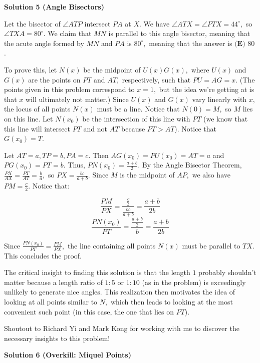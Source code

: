 \begin{enumerate}
 



\textbf{Solution 5 (Angle Bisectors)}

Let the bisector of $\angle ATP$ intersect $PA$ at $X.$ We have $\angle ATX = \angle PTX = 44^{\circ},$ so $\angle TXA = 80^{\circ}.$ We claim that $MN$ is parallel to this angle bisector, meaning that the acute angle formed by $MN$ and $PA$ is $80^{\circ},$ meaning that the answer is $\boxed{\textbf{(E) } 80}$.

 To prove this, let $N(x)$ be the midpoint of $U(x)G(x),$ where $U(x)$ and $G(x)$ are the points on $PT$ and $AT,$ respectively, such that $PU = AG = x.$ (The points given in this problem correspond to $x=1,$ but the idea we're getting at is that $x$ will ultimately not matter.) Since $U(x)$ and $G(x)$ vary linearly with $x,$ the locus of all points $N(x)$ must be a line. Notice that $N(0) = M,$ so $M$ lies on this line. Let $N(x_0)$ be the intersection of this line with $PT$ (we know that this line will intersect $PT$ and not $AT$ because $PT > AT$). Notice that $G(x_0) = T.$

 Let $AT = a, TP = b, PA = c.$ Then $AG(x_0) = PU(x_0) = AT = a$ and $PG(x_0) = PT = b.$ Thus, $PN(x_0) = \frac{a+b}{2}.$ By the Angle Bisector Theorem, $\frac{PX}{AX} = \frac{PT}{AT} = \frac{b}{a},$ so $PX = \frac{bc}{a+b}.$ Since $M$ is the midpoint of $AP,$ we also have $PM = \frac{c}{2}.$ Notice that:

 
 \[\frac{PM}{PX} = \frac{\frac{c}{2}}{\frac{bc}{a+b}} = \frac{a+b}{2b}\]
 \[\frac{PN(x_0)}{PT} = \frac{\frac{a+b}{2}}{b} = \frac{a+b}{2b}\]

 Since $\frac{PN(x_0)}{PT} = \frac{PM}{PX},$ the line containing all points $N(x)$ must be parallel to $TX.$ This concludes the proof.

 The critical insight to finding this solution is that the length $1$ probably shouldn't matter because a length ratio of $1:5$ or $1:10$ (as in the problem) is exceedingly unlikely to generate nice angles. This realization then motivates the idea of looking at all points similar to $N,$ which then leads to looking at the most convenient such point (in this case, the one that lies on $PT$).

 Shoutout to Richard Yi and Mark Kong for working with me to discover the necessary insights to this problem!

 



\textbf{Solution 6 (Overkill: Miquel Points)}


\end{enumerate}

